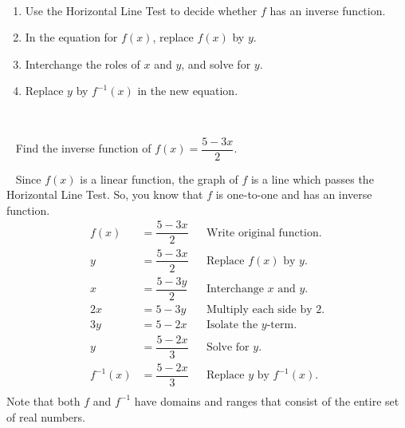 \begin{proposition}\cite{ci}
    ~\\
    \begin{enumerate}
        \item Use the Horizontal Line Test to decide whether $f$ has an inverse function.
        \item In the equation for $f(x)$, replace $f(x)$ by $y$.
        \item Interchange the roles of $x$ and $y$, and solve for $y$.
        \item Replace $y$ by $f^{-1}(x)$ in the new equation.
    \end{enumerate}
\end{proposition}
~\\
\begin{example} \cite{ci}~\newline
    Find the inverse function of $f(x)=\dfrac{5-3x}{2}.$\\
    \begin{solution}~\newline
        Since $f(x)$ is a linear function, the graph of $f$ is a line which passes the Horizontal Line Test. So, you know that $f$ is one-to-one and has an inverse function.
        \begin{align*}
            f(x)&=\dfrac{5-3x}{2}&&\text{Write original function.}\\
            y&=\dfrac{5-3x}{2}&&\text{Replace $f(x)$ by $y$.}\\
            x&=\dfrac{5-3y}{2}&&\text{Interchange $x$ and $y$.}\\
            2x&=5-3y&&\text{Multiply each side by 2.}\\
            3y&=5-2x&&\text{Isolate the $y$-term.}\\
            y&=\dfrac{5-2x}{3}&&\text{Solve for $y$.}\\
            f^{-1}(x)&=\dfrac{5-2x}{3}&&\text{Replace $y$ by $f^{-1}(x)$.}\\
        \end{align*}
        Note that both $f$ and $f^{-1}$ have domains and ranges that consist of the entire set of real numbers.
	\end{solution}
\end{example}

